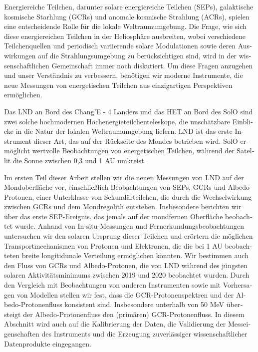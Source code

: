 \begin{otherlanguage}{ngerman}
    Energiereiche Teilchen, darunter solare energiereiche Teilchen (SEPs), galaktische kosmische Starhlung (GCRs) und anomale kosmische Strahlung (ACRs), spielen eine entscheidende Rolle für die lokale Weltraumumgebung. Die Frage, wie sich diese energiereichen Teilchen in der Heliosphäre ausbreiten, wobei verschiedene Teilchenquellen und periodisch variierende solare Modulationen sowie deren Auswirkungen auf die Strahlungsumgebung zu berücksichtigen sind, wird in der wissenschaftlichen Gemeinschaft immer noch diskutiert. Um diese Fragen anzugehen und unser Verständnis zu verbessern, benötigen wir moderne Instrumente, die neue Messungen von energetischen Teilchen aus einzigartigen Perspektiven ermöglichen.

    Das \ac{LND} an Bord des Chang'E - 4 Landers und das \ac{HET} an Bord des \ac{SolO} sind zwei solche hochmodernen Hochenergieteilchenteleskope, die unschätzbare Einblicke in die Natur der lokalen Weltraumumgebung liefern. \ac{LND} ist das erste Instrument dieser Art, das auf der Rückseite des Mondes betrieben wird. \ac{SolO} ermöglicht wertvolle Beobachtungen von energetischen Teilchen, w\"{a}hrend der Satellit die Sonne zwischen 0,3 und 1 AU umkreist.
    
    Im ersten Teil dieser Arbeit stellen wir die neuen Messungen von \ac{LND} auf der Mondoberfläche vor, einschließlich Beobachtungen von \acp{SEP}, \acp{GCR} und Albedo-Protonen, einer Unterklasse von Sekundärteilchen, die durch die Wechselwirkung zwischen \acp{GCR} und dem Mondregolith entstehen. Insbesondere berichten wir über das erste \ac{SEP}-Ereignis, das jemals auf der mondfernen Oberfläche beobachtet wurde. Anhand von In-situ-Messungen und Fernerkundungsbeobachtungen untersuchen wir den solaren Ursprung dieser Teilchen und erörtern die möglichen Transportmechanismen von Protonen und Elektronen, die die bei 1 AU beobachteten breite longitidunale Verteilung ermöglichen könnten. Wir bestimmen auch den Fluss von \acp{GCR} und Albedo-Protonen, die von \ac{LND} während des jüngsten solaren Aktivitätsminimums zwischen 2019 und 2020 beobachtet wurden. Durch den Vergleich mit Beobachtungen von anderen Instrumenten sowie mit Vorhersagen von Modellen stellen wir fest, dass die \ac{GCR}-Protonenspektren und der Albedo-Protonenfluss konsistent sind. Insbesondere unterhalb von 50 MeV übersteigt der Albedo-Protonenfluss den (primären) \ac{GCR}-Protonenfluss.
    In diesem Abschnitt wird auch auf die Kalibrierung der Daten, die Validierung der Messeigenschaften des Instruments und die Erzeugung zuverlässiger wissenschaftlicher Datenprodukte eingegangen.
    

\end{otherlanguage}
